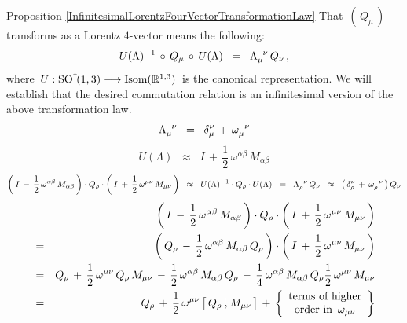 \vskip 0.3cm
\noindent
\proofof Proposition \ref{InfinitesimalLorentzFourVectorTransformationLaw}
\vskip 0.1cm
\noindent
That \,$\left(\,Q_{\mu}\,\right)$\, transforms as a Lorentz $4$-vector means the following:
\begin{equation*}
U(\Lambda)^{-1} \,\circ\, Q_{\mu} \,\circ\, U(\Lambda)
\;\; = \;\;
	\Lambda_{\mu}^{{\color{white}\mu}\nu}\,Q_{\nu}\,,
\end{equation*}
where
\,$U : \textnormal{SO}^{\uparrow\!}(1,3) \longrightarrow \textnormal{Isom}(\mathbb{R}^{1,3})$\,
is the canonical representation.
We will establish that the desired commutation relation
is an infinitesimal version of the above transformation law.
\begin{equation*}
\Lambda_{\mu}^{{\color{white}\mu}\nu}
\;\; = \;\;
	\delta_{\mu}^{\nu}
	\,+\,
	\omega_{\mu}^{{\color{white}\mu}\nu}
\end{equation*}
\begin{equation*}
U(\Lambda)
\;\; \approx \;\;
	I
	\,+\,
	\dfrac{1}{2}\,\omega^{\alpha\beta}\,M_{\alpha\beta}
\end{equation*}
\begin{equation*}
\left(\,
	I \,-\, \dfrac{1}{2}\,\omega^{\alpha\beta}\,M_{\alpha\beta}
	\,\right)
\cdot
Q_{\rho}
\cdot
\left(\,
	I \,+\, \dfrac{1}{2}\,\omega^{\mu\nu}\,M_{\mu\nu}
	\,\right)
\;\; \approx \;\;
	U(\Lambda)^{-1} \cdot Q_{\rho} \cdot U(\Lambda)
\;\; = \;\;
	\Lambda_{\rho}^{{\color{white}\mu}\nu}\,Q_{\nu}
\;\; \approx \;\;
	\left(\,
		\delta_{\rho}^{\nu} \,+\, \omega_{\rho}^{{\color{white}\alpha}\nu}
		\,\right)
	Q_{\nu}
\end{equation*}
\begin{eqnarray*}
&&
	\left(\,
		I \,-\, \dfrac{1}{2}\,\omega^{\alpha\beta}\,M_{\alpha\beta}
		\,\right)
	\cdot
	Q_{\rho}
	\cdot
	\left(\,
		I \,+\, \dfrac{1}{2}\,\omega^{\mu\nu}\,M_{\mu\nu}
		\,\right)
\\
& = &
	\left(\,
		Q_{\rho} \,-\, \dfrac{1}{2}\,\omega^{\alpha\beta}\,M_{\alpha\beta}\,Q_{\rho}
		\,\right)
	\cdot
	\left(\,
		I \,+\, \dfrac{1}{2}\,\omega^{\mu\nu}\,M_{\mu\nu}
		\,\right)
\\
& = &
	Q_{\rho}
	\,+\,
	\dfrac{1}{2}\,\omega^{\mu\nu}\,Q_{\rho}\,M_{\mu\nu}
	\,-\,
	\dfrac{1}{2}\,\omega^{\alpha\beta}\,M_{\alpha\beta}\,Q_{\rho}
	\,-\,
	\dfrac{1}{4}\,\omega^{\alpha\beta}\,M_{\alpha\beta}\,Q_{\rho}
	\dfrac{1}{2}\,\omega^{\mu\nu}\,M_{\mu\nu}
\\
& = &
	Q_{\rho}
	\,+\,
	\dfrac{1}{2}\,\omega^{\mu\nu}\left[\,
		Q_{\rho}\,\overset{{\color{white}1}}{,}\,M_{\mu\nu}
		\,\right]
	\,+\,
	\left\{\begin{array}{c}
		\textnormal{terms of higher}
		\\
		\textnormal{order in \,$\omega_{\mu\nu}$}
		\end{array}\right\}		
\end{eqnarray*}
